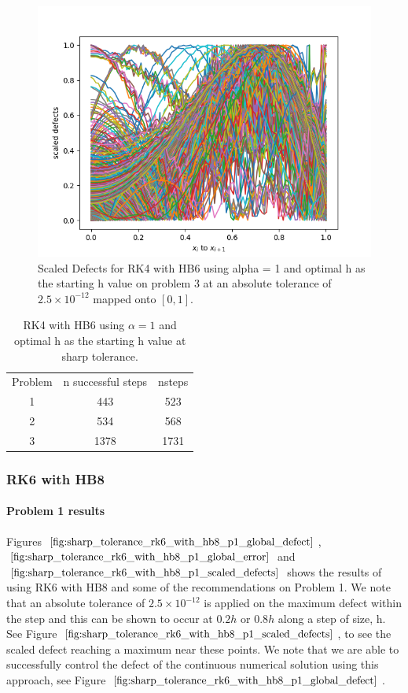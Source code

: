 \begin{figure}[H]
\centering
\includegraphics[width=0.7\linewidth]{./figures/sharp_tolerance_rk4_with_hb6_p3_scaled_defects}
\caption{Scaled Defects for RK4 with HB6 using alpha = 1 and optimal h as the starting h value on problem 3 at an absolute tolerance of $2.5 \times 10^{-12}$ mapped onto $[0, 1]$.}
\label{fig:sharp_tolerance_rk4_with_hb6_p3_scaled_defects}
\end{figure}

\begin{table}[h]
\caption {RK4 with HB6 using $\alpha = 1$ and optimal h as the starting h value at sharp tolerance.} \label{tab:rk4_with_hb6_sharp_tolerance}
\begin{center}
\begin{tabular}{ c c c } 
Problem & n successful steps      &       nsteps \\ 
1       & 443                     &        523   \\ 
2       & 534                     &        568  \\
3       & 1378                    &        1731  \\
\end{tabular}
\end{center}
\end{table}	


\subsubsection{RK6 with HB8}

\paragraph{Problem 1 results}
Figures $\ref{fig:sharp_tolerance_rk6_with_hb8_p1_global_defect}$, $\ref{fig:sharp_tolerance_rk6_with_hb8_p1_global_error}$ and $\ref{fig:sharp_tolerance_rk6_with_hb8_p1_scaled_defects}$ shows the results of using RK6 with HB8 and some of the recommendations on Problem 1. We note that an absolute tolerance of $2.5 \times 10^{-12}$ is applied on the maximum defect within the step and this can be shown to occur at $0.2h$ or $0.8h$ along a step of size, h. See Figure $\ref{fig:sharp_tolerance_rk6_with_hb8_p1_scaled_defects}$, to see the scaled defect reaching a maximum near these points. We note that we are able to successfully control the defect of the continuous numerical solution using this approach, see Figure $\ref{fig:sharp_tolerance_rk6_with_hb8_p1_global_defect}$. 

